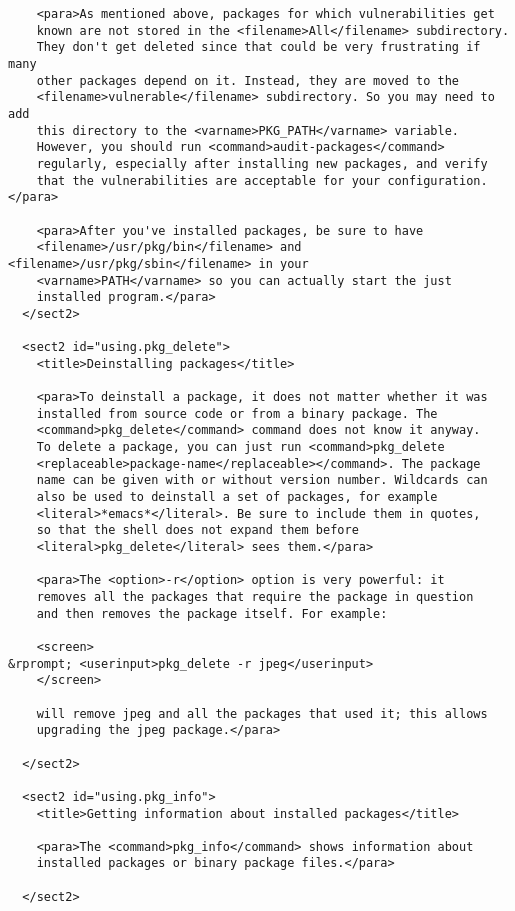 \begin{verbatim}
    <para>As mentioned above, packages for which vulnerabilities get
    known are not stored in the <filename>All</filename> subdirectory.
    They don't get deleted since that could be very frustrating if many
    other packages depend on it. Instead, they are moved to the
    <filename>vulnerable</filename> subdirectory. So you may need to add
    this directory to the <varname>PKG_PATH</varname> variable. 
    However, you should run <command>audit-packages</command>
    regularly, especially after installing new packages, and verify
    that the vulnerabilities are acceptable for your configuration.</para>

    <para>After you've installed packages, be sure to have
    <filename>/usr/pkg/bin</filename> and <filename>/usr/pkg/sbin</filename> in your
    <varname>PATH</varname> so you can actually start the just
    installed program.</para>
  </sect2>

  <sect2 id="using.pkg_delete">
    <title>Deinstalling packages</title>

    <para>To deinstall a package, it does not matter whether it was
    installed from source code or from a binary package. The
    <command>pkg_delete</command> command does not know it anyway.
    To delete a package, you can just run <command>pkg_delete
    <replaceable>package-name</replaceable></command>. The package
    name can be given with or without version number. Wildcards can
    also be used to deinstall a set of packages, for example
    <literal>*emacs*</literal>. Be sure to include them in quotes,
    so that the shell does not expand them before
    <literal>pkg_delete</literal> sees them.</para>

    <para>The <option>-r</option> option is very powerful: it
    removes all the packages that require the package in question
    and then removes the package itself. For example:

    <screen>
&rprompt; <userinput>pkg_delete -r jpeg</userinput>
    </screen>

    will remove jpeg and all the packages that used it; this allows
    upgrading the jpeg package.</para>

  </sect2>

  <sect2 id="using.pkg_info">
    <title>Getting information about installed packages</title>

    <para>The <command>pkg_info</command> shows information about
    installed packages or binary package files.</para>

  </sect2>


\end{verbatim}
